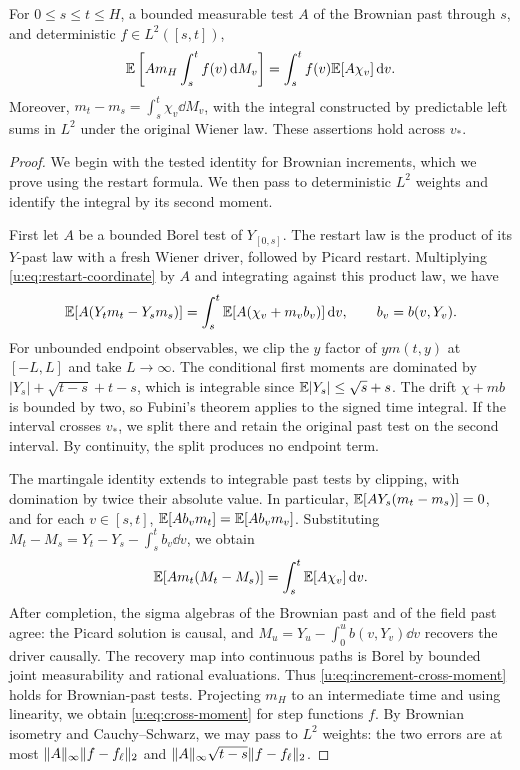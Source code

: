 \begin{lemma}\label{u:lem:cross}
For $0\le s\le t\le H$, a bounded measurable test $A$ of the
Brownian past through $s$, and deterministic $f\in L^2([s,t])$,
\begin{equation}\label{u:eq:cross-moment}
 \mathbb E\left[A m_H\int_s^t f(v)\,\mathrm d M_v\right]
 =\int_s^t f(v)\mathbb E[A\chi_v]\,\mathrm d v.
\end{equation}
Moreover, $m_t-m_s=\int_s^t\chi_v\dd M_v$, with the integral
constructed by predictable left sums in $L^2$ under the original
Wiener law. These assertions hold across $v_*$.
\end{lemma}

\begin{proof}
We begin with the tested identity for Brownian increments, which we
prove using the restart formula. We then pass to deterministic $L^2$ weights and
identify the integral by its second moment.

First let $A$ be a bounded Borel test of $Y_{[0,s]}$. The restart law
is the product of its $Y$-past law with a fresh Wiener driver,
followed by Picard restart. Multiplying
\eqref{u:eq:restart-coordinate} by $A$ and integrating against this
product law, we have
\[
 \mathbb E[A(Y_tm_t-Y_sm_s)]
 =\int_s^t\mathbb E[A(\chi_v+m_vb_v)]\,\mathrm d v,
 \qquad b_v=b(v,Y_v).
\]
For unbounded endpoint observables, we clip the $y$ factor of
$ym(t,y)$ at $[-L,L]$ and take $L\to\infty$. The conditional first
moments are dominated by $|Y_s|+\sqrt{t-s}+t-s$, which is
integrable since $\mathbb E|Y_s|\le\sqrt s+s$. The drift
$\chi+mb$ is bounded by two, so Fubini's theorem applies to the signed
time integral. If the interval crosses $v_*$, we split there and
retain the original past test on the second interval. By continuity,
the split produces no endpoint term.

The martingale identity extends to integrable past tests by clipping,
with domination by twice their absolute value. In particular,
$\mathbb E[AY_s(m_t-m_s)]=0$, and for each $v\in[s,t]$,
$\mathbb E[Ab_vm_t]=\mathbb E[Ab_vm_v]$. Substituting
$M_t-M_s=Y_t-Y_s-\int_s^t b_v\dd v$, we obtain
\begin{equation}\label{u:eq:increment-cross-moment}
 \mathbb E[A m_t(M_t-M_s)]=\int_s^t\mathbb E[A\chi_v]\,\mathrm d v.
\end{equation}
After completion, the sigma algebras of the Brownian past and of the
field past agree: the Picard solution is causal, and
$M_u=Y_u-\int_0^u b(v,Y_v)\dd v$ recovers the driver causally.
The recovery map into continuous paths is Borel by bounded joint
measurability and rational evaluations. Thus
\eqref{u:eq:increment-cross-moment} holds for Brownian-past tests.
Projecting $m_H$ to an intermediate time and using linearity, we
obtain \eqref{u:eq:cross-moment} for step functions $f$. By Brownian
isometry and Cauchy--Schwarz, we may pass to $L^2$ weights: the two
errors
are at most $\lVert A\rVert_\infty\lVert f-f_\ell\rVert_2$ and
$\lVert A\rVert_\infty\sqrt{t-s}\lVert f-f_\ell\rVert_2$.


\end{proof}
